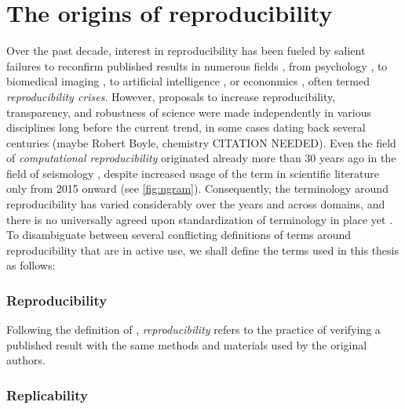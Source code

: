 \section{The origins of reproducibility}

Over the past decade, interest in reproducibility has been fueled by salient failures to reconfirm published results in numerous fields \citep{baker20161}, from psychology \citep{open2015estimating}, to biomedical imaging \citep{wagner202310}, to artificial intelligence \citep{hutson2018artificial}, or econonmics \citep{camerer2016evaluating}, often termed \textit{reproducibility crises}.
However, proposals to increase reproducibility, transparency, and robustness of science were made independently in various disciplines long before the current trend, in some cases dating back several centuries (maybe Robert Boyle, chemistry CITATION NEEDED).
Even the field of \textit{computational reproducibility} originated already more than 30 years ago in the field of seismology \citep{claerbout1992electronic} \citep{buckheit1995wavelab}, despite increased usage of the term in scientific literature only from 2015 onward (see \cref{fig:ngram}).
Consequently, the terminology around reproducibility has varied considerably over the years and across domains, and there is no universally agreed upon standardization of terminology in place yet \citep{barba2018terminologies}.
To disambiguate between several conflicting definitions of terms around reproducibility that are in active use, we shall define the terms used in this thesis as follows:

\subsubsection{Reproducibility}

Following the definition of \citet{peng2006}, \textit{reproducibility} refers to the practice of verifying a published result with the same methods and materials used by the original authors.

\subsubsection{Replicability}

